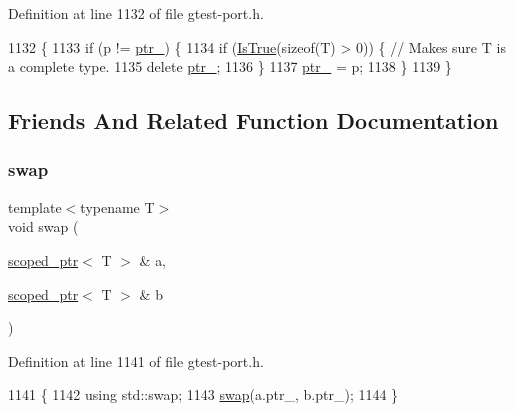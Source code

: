 Definition at line 1132 of file gtest-\/port.\+h.


\begin{DoxyCode}
1132                           \{
1133     \textcolor{keywordflow}{if} (p != \hyperlink{classtesting_1_1internal_1_1scoped__ptr_ab69d9f1f216ae91f8b8abca63e797397}{ptr\_}) \{
1134       \textcolor{keywordflow}{if} (\hyperlink{namespacetesting_1_1internal_a527b9bcc13669b9a16400c8514266254}{IsTrue}(\textcolor{keyword}{sizeof}(T) > 0)) \{  \textcolor{comment}{// Makes sure T is a complete type.}
1135         \textcolor{keyword}{delete} \hyperlink{classtesting_1_1internal_1_1scoped__ptr_ab69d9f1f216ae91f8b8abca63e797397}{ptr\_};
1136       \}
1137       \hyperlink{classtesting_1_1internal_1_1scoped__ptr_ab69d9f1f216ae91f8b8abca63e797397}{ptr\_} = p;
1138     \}
1139   \}
\end{DoxyCode}


\subsection{Friends And Related Function Documentation}
\mbox{\label{classtesting_1_1internal_1_1scoped__ptr_a01bc0441e6a3ebf26807ac523392ca86}} 
\subsubsection{\texorpdfstring{swap}{swap}}
{\footnotesize\ttfamily template$<$typename T$>$ \\
void swap (\begin{DoxyParamCaption}\item[{\hyperlink{classtesting_1_1internal_1_1scoped__ptr}{scoped\+\_\+ptr}$<$ T $>$ \&}]{a,  }\item[{\hyperlink{classtesting_1_1internal_1_1scoped__ptr}{scoped\+\_\+ptr}$<$ T $>$ \&}]{b }\end{DoxyParamCaption})\hspace{0.3cm}{\ttfamily [friend]}}



Definition at line 1141 of file gtest-\/port.\+h.


\begin{DoxyCode}
1141                                                  \{
1142     \textcolor{keyword}{using} std::swap;
1143     \hyperlink{classtesting_1_1internal_1_1scoped__ptr_a01bc0441e6a3ebf26807ac523392ca86}{swap}(a.ptr\_, b.ptr\_);
1144   \}
\end{DoxyCode}


